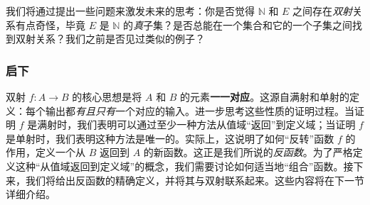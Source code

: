 我们将通过提出一些问题来激发未来的思考：你是否觉得 $\mathbb{N}$ 和 $E$ 之间存在\emph{双射}关系有点奇怪，毕竟 $E$ 是 $\mathbb{N}$ 的\emph{真}子集？是否总能在一个集合和它的一个子集之间找到双射关系？我们之前是否见过类似的例子？

\subsubsection*{启下} 

双射 $f : A \to B$ 的核心思想是将 $A$ 和 $B$ 的元素\textbf{一一对应}。这源自满射和单射的定义：每个输出都\emph{有且只有}一个对应的输入。进一步思考这些性质的证明过程。当证明 $f$ 是满射时，我们表明可以通过至少一种方法从值域``返回''到定义域；当证明 $f$ 是单射时，我们表明这种方法是唯一的。实际上，这说明了如何``反转''函数 $f$ 的作用，定义一个从 $B$ 返回到 $A$ 的新函数。这正是我们所说的\emph{反函数}。为了严格定义这种``从值域返回到定义域''的概念，我们需要讨论如何适当地``组合''函数。接下来，我们将给出反函数的精确定义，并将其与双射联系起来。这些内容将在下一节详细介绍。

